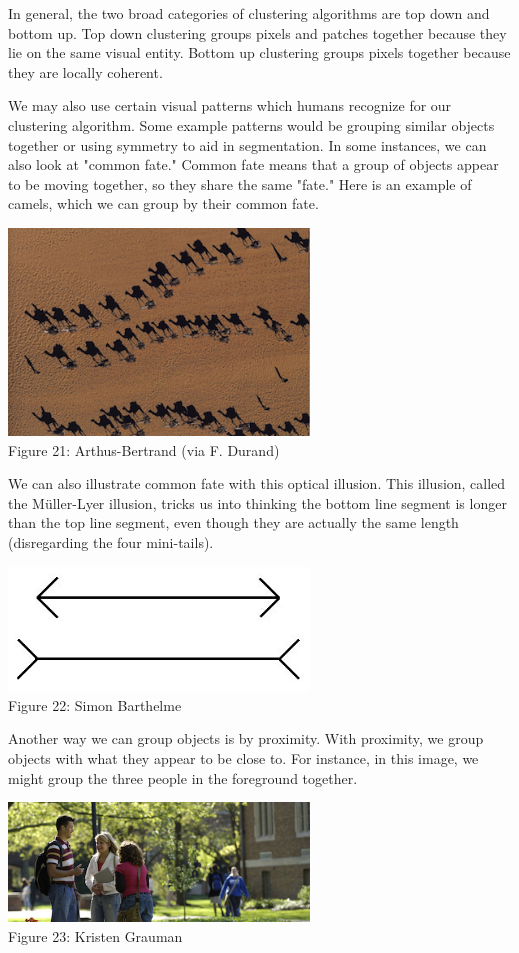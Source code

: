 \documentclass{article}
\begin{document}
In general, the two broad categories of clustering algorithms are top down and bottom up. Top down clustering groups pixels and patches together because they lie on the same visual entity. Bottom up clustering groups pixels together because they are locally coherent.

We may also use certain visual patterns which humans recognize for our clustering algorithm. Some example patterns would be grouping similar objects together or using symmetry to aid in segmentation. In some instances, we can also look at "common fate." Common fate means that a group of objects appear to be moving together, so they share the same "fate." Here is an example of camels, which we can group by their common fate.

\begin{center}
\includegraphics[width=8cm]{camels.png} \\
Figure 21: Arthus-Bertrand (via F. Durand)
\end{center}

We can also illustrate common fate with this optical illusion. This illusion, called the Müller-Lyer illusion, tricks us into thinking the bottom line segment is longer than the top line segment, even though they are actually the same length (disregarding the four mini-tails).

\begin{center}
\includegraphics[width=8cm]{muller.jpg} \\
Figure 22: Simon Barthelme
\end{center}

Another way we can group objects is by proximity. With proximity, we group objects with what they appear to be close to. For instance, in this image, we might group the three people in the foreground together.
\begin{center}
\includegraphics[width=8cm]{people.png} \\
Figure 23: Kristen Grauman
\end{center}


\small


\end{document}
